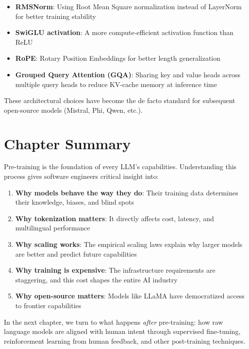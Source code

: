 \begin{itemize}[leftmargin=*]
    \item \textbf{RMSNorm}: Using Root Mean Square normalization instead of LayerNorm for better training stability
    \item \textbf{SwiGLU activation}: A more compute-efficient activation function than ReLU
    \item \textbf{RoPE}: Rotary Position Embeddings for better length generalization
    \item \textbf{Grouped Query Attention (GQA)}: Sharing key and value heads across multiple query heads to reduce KV-cache memory at inference time
\end{itemize}

These architectural choices have become the de facto standard for subsequent open-source models (Mistral, Phi, Qwen, etc.).

\section{Chapter Summary}

Pre-training is the foundation of every LLM's capabilities. Understanding this process gives software engineers critical insight into:

\begin{enumerate}[leftmargin=*]
    \item \textbf{Why models behave the way they do}: Their training data determines their knowledge, biases, and blind spots
    \item \textbf{Why tokenization matters}: It directly affects cost, latency, and multilingual performance
    \item \textbf{Why scaling works}: The empirical scaling laws explain why larger models are better and predict future capabilities
    \item \textbf{Why training is expensive}: The infrastructure requirements are staggering, and this cost shapes the entire AI industry
    \item \textbf{Why open-source matters}: Models like LLaMA have democratized access to frontier capabilities
\end{enumerate}

In the next chapter, we turn to what happens \emph{after} pre-training: how raw language models are aligned with human intent through supervised fine-tuning, reinforcement learning from human feedback, and other post-training techniques.

